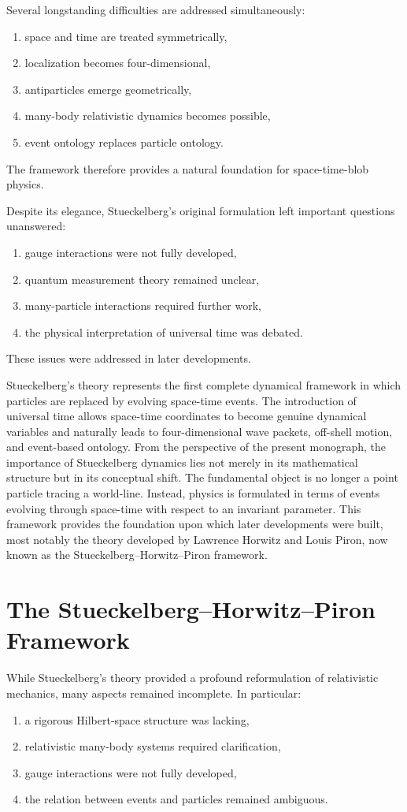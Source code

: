 Several longstanding difficulties are addressed simultaneously:
\begin{enumerate}
\item space and time are treated symmetrically,
\item localization becomes four-dimensional,
\item antiparticles emerge geometrically,
\item many-body relativistic dynamics becomes possible,
\item event ontology replaces particle ontology.
\end{enumerate}
The framework therefore provides a natural foundation for space-time-blob physics.

Despite its elegance, Stueckelberg's original formulation left important 
questions unanswered:
\begin{enumerate}
\item gauge interactions were not fully developed,
\item quantum measurement theory remained unclear,
\item many-particle interactions required further work,
\item the physical interpretation of universal time was debated.
\end{enumerate}
These issues were addressed in later developments.

Stueckelberg's theory represents the first complete dynamical framework in 
which particles are replaced by evolving space-time events. The introduction
of universal time allows space-time coordinates to become genuine dynamical
variables and naturally leads to four-dimensional wave packets, off-shell
motion, and event-based ontology.
From the perspective of the present monograph, the importance of Stueckelberg 
dynamics lies not merely in its mathematical structure but in its conceptual 
shift. The fundamental object is no longer a point particle tracing a world-line.
Instead, physics is formulated in terms of events evolving through space-time 
with respect to an invariant parameter.
This framework provides the foundation upon which later developments were built, 
most notably the theory developed by Lawrence Horwitz and Louis Piron,
now known as the Stueckelberg--Horwitz--Piron framework.

 \section{The Stueckelberg--Horwitz--Piron Framework}
While Stueckelberg's 
theory provided a profound reformulation of relativistic mechanics,
many aspects remained incomplete. In particular:
\begin{enumerate}
\item a rigorous Hilbert-space structure was lacking,
\item relativistic many-body systems required clarification,
\item gauge interactions were not fully developed,
\item the relation between events and particles remained ambiguous.
\end{enumerate}

